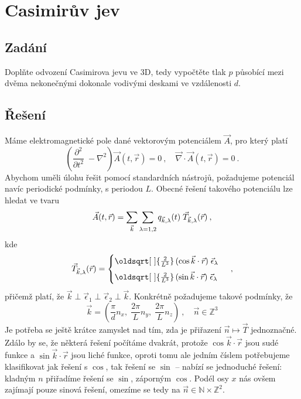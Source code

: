 \documentclass[10pt,a4paper]{article}
\renewcommand*{\sqrt}[2][\ ]{\oldsqrt[#1]{#2\,}\,}
\def\vph{\vphantom}
\newcommand{\pd}[2]{\frac{\partial  #1}{\partial  #2} \;}
\def\N{\mathbb{N}}
\def\Z{\mathbb{Z}}
\begin{document}
\section{Casimirův jev}

\subsection{Zadání}
Doplňte odvození Casimirova jevu ve 3D, tedy vypočtěte tlak $p$ působící mezi dvěma nekonečnými dokonale vodivými deskami ve vzdálenosti $d$.

\subsection{Řešení}
Máme elektromagnetické pole dané vektorovým potenciálem $\vec A$, pro který platí
\begin{equation*}
    \left(\pd{^2}{t^2} - \nabla^2\right)
    \vec A(t, \vec r) = 0
    \: , \quad
    \vec\nabla \cdot \vec A(t, \vec r) = 0
    \: .
\end{equation*}
Abychom uměli úlohu řešit pomocí standardních nástrojů, požadujeme potenciál navíc periodické podmínky, s periodou $L$. Obecné řešení takového potenciálu lze hledat ve tvaru
\begin{equation*}
    \vec A(t, \vec r)
    =
    \sum_{\vec k}
    \sum_{\vph{\vec k} \lambda = 1, 2}
    q_{\vec k, \lambda}(t) \;
    \vec T_{\vec k, \lambda}(\vec r)
    \: ,
\end{equation*}
kde
\begin{equation*}
    \vec T_{\vec k, \lambda}(\vec r)
    = \begin{cases}
        \sqrt{\frac{2}{L^3}\!}
        (\cos \vec k \cdot \vec r) \;
        \vec\epsilon_\lambda
        \\[5pt]
        \sqrt{\frac{2}{L^3}\!}
        (\sin \vec k \cdot \vec r) \;
        \vec\epsilon_\lambda
    \end{cases}
    \: ,
\end{equation*}
přičemž platí, že $\vec k \perp \vec\epsilon_1 \perp \vec\epsilon_2 \perp \vec k$.
Konkrétně požadujeme takové podmínky, že
\begin{equation*}
    \vec k = \left(
        \frac{\pi}{d} n_x, \;
        \frac{2\pi}{L} n_y, \;
        \frac{2\pi}{L} n_z
    \right)
    \: , \quad
    \vec n \in \Z^3
\end{equation*}
Je potřeba se ještě krátce zamyslet nad tím, zda je přiřazení $\vec n \mapsto \vec T$ jednoznačné. Zdálo by se, že některá řešení počítáme dvakrát, protože $\cos  \vec k \cdot \vec r$ jsou sudé funkce a $\sin \vec k \cdot \vec r$ jsou liché funkce, oproti tomu ale jedním číslem potřebujeme klasifikovat jak řešení s $\cos$, tak řešení se $\sin$ – nabízí se jednoduché řešení: kladným $n$ přiřadíme řešení se $\sin$, záporným $\cos$. Podél osy $x$ nás ovšem zajímají pouze sinová řešení, omezíme se tedy na $\vec n \in \N \times \Z^2$.
\end{document}

